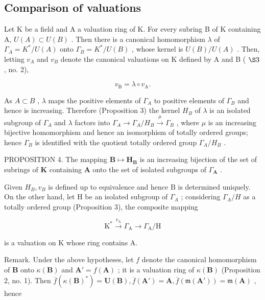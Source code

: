 \subsection{Comparison of valuations}

Let K be a field and A a valuation ring of K. For every subring B of K containing A, \(U(A) \subset U(B)\) . Then there is a canonical homomorphism \(\lambda\) of \(\Gamma_{A} = K^{*}/U(A)\) onto \(\Gamma_{B} = K^{*}/U(B)\) , whose kernel is \(U(B)/U(A)\) . Then, letting \(v_{A}\) and \(v_{B}\) denote the canonical valuations on K defined by A and B ( \(\S 3\) , no. 2),

\[
v _ {\mathrm{B}} = \lambda \circ v _ {\mathrm{A}}.\tag{1}
\]

As \(A \subset B\) , \(\lambda\) maps the positive elements of \(\Gamma_{A}\) to positive elements of \(\Gamma_{B}\) and hence is increasing. Therefore (Proposition 3) the kernel \(H_{B}\) of \(\lambda\) is an isolated subgroup of \(\Gamma_{A}\) and \(\lambda\) factors into \(\Gamma_{A} \to \Gamma_{A}/H_{B} \xrightarrow{\mu} \Gamma_{B}\) , where \(\mu\) is an increasing bijective homomorphism and hence an isomorphism of totally ordered groups; hence \(\Gamma_{B}\) is identified with the quotient totally ordered group \(\Gamma_{A}/H_{B}\) .

PROPOSITION 4. The mapping \(\mathbf{B} \mapsto \mathbf{H}_{\mathbf{B}}\) is an increasing bijection of the set of subrings of \(\mathbf{K}\) containing \(\mathbf{A}\) onto the set of isolated subgroups of \(\Gamma_{\mathbf{A}}\) .

Given \(H_{B}, v_{B}\) is defined up to equivalence and hence B is determined uniquely. On the other hand, let H be an isolated subgroup of \(\Gamma_{A}\) ; considering \(\Gamma_{A}/H\) as a totally ordered group (Proposition 3), the composite mapping

\[
\mathrm{K} ^ {*} \xrightarrow {v _ {\mathrm{A}}} \Gamma_ {\mathrm{A}} \longrightarrow \Gamma_ {\mathrm{A}} / \mathrm{H}
\]

is a valuation on K whose ring contains A.

Remark. Under the above hypotheses, let \(f\) denote the canonical homomorphism of \(\mathbf{B}\) onto \(\kappa(\mathbf{B})\) and \(\mathbf{A}' = f(\mathbf{A})\) ; it is a valuation ring of \(\kappa(\mathbf{B})\) (Proposition 2, no. 1). Then \(\overline{f}(\kappa(\mathbf{B})^*) = \mathbf{U}(\mathbf{B}), \overline{f}(\mathbf{A}') = \mathbf{A}, \overline{f}(\mathfrak{m}(\mathbf{A}')) = \mathfrak{m}(\mathbf{A})\) , hence

